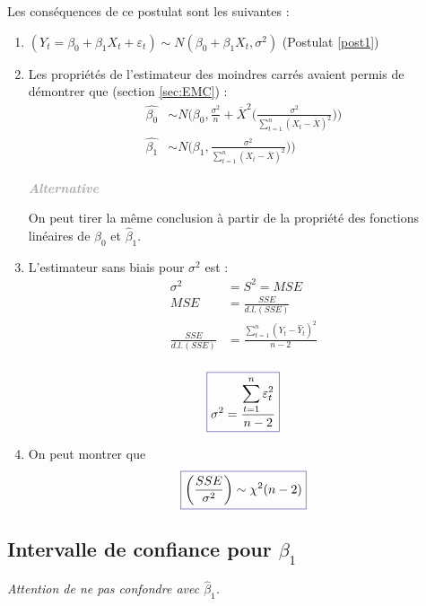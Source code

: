 \documentclass[11pt,french]{report}
\newenvironment{moreInfo}[1]
	{\begin{mdframed}
	\textcolor{darkgray}{\huge \raisebox{-3.5pt}{\faInfo} 
	\hspace{0.5cm} \large\bfseries #1}\\[5pt]
	\normalsize
	\makebox[0.1\textwidth][l]{}	
	\begin{minipage}{10cm}}
	{	\end{minipage}
	\end{mdframed}}
\begin{document}
Les conséquences de ce postulat sont les suivantes :
\begin{enumerate}
\item $(Y_t = \beta_0 + \beta_1X_t + \varepsilon_t) \sim N(\beta_0 + \beta_1X_t, \sigma^2)$ (Postulat \ref{post1})
\item Les propriétés de l'estimateur des moindres carrés avaient permis de démontrer que (section \ref{sec:EMC}) :
	\begin{align*}
	     \hat{\beta_0} &\sim N\Bigg(\beta_0, \frac{\sigma^2}{n}  + \overline{X}^2 \bigg(\frac{\sigma^2}{\displaystyle\sum_{t=1}^n (X_t - \overline{X})^2}\bigg)\Bigg) \\
	     \hat{\beta_1} &\sim N\Bigg(\beta_1, \frac{\sigma^2}{\displaystyle\sum_{t=1}^n(X_t - \overline{X})^2})\Bigg)
	\end{align*}
	
\begin{moreInfo}{\color{Gray}\emph{Alternative}
     \color{black}}
	On peut tirer la même conclusion à partir de la propriété des fonctions linéaires de $\hat{\beta}_0$ et $\hat{\beta}_1$.
\end{moreInfo}

\item L'estimateur sans biais pour $\sigma^2$ est :
\begin{align*}
\sigma^2 &= S^2 = MSE \\
MSE &= \frac{SSE}{d.l.(SSE)} \\
\frac{SSE}{d.l.(SSE)} &= \frac{\displaystyle\sum_{t=1}^n (Y_t - \hat{Y}_t)^2}{n-2} \\
\end{align*}

\begin{equation}
\label{eq:s2}
\color{Blue}
\boxed{\color{black}
\sigma^2 = \frac{\displaystyle\sum_{t=1}^n \varepsilon_t^2}{n-2}}
\end{equation}

\item On peut montrer que 
\begin{equation}
\label{eq:ssesigma}
\color{Blue}
\boxed{\color{black}
\bigg(\frac{SSE}{\sigma^2}\bigg) \sim \chi^2(n - 2) }
\end{equation}
\end{enumerate}

\subsection{Intervalle de confiance pour $\beta_1$}
\label{ICBeta1}
\emph{Attention de ne pas confondre avec $\hat{\beta}_1$.}
\end{document}
